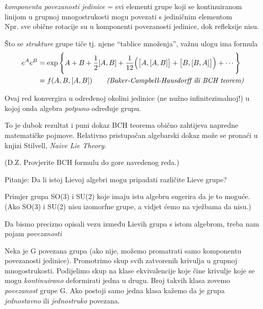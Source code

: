 \emph{komponenta povezanosti jedinice} = svi elementi grupe koji se
kontinuiranom linijom u grupnoj mnogostrukosti mogu povezati s
jediničnim elementom\\
 Npr. sve obične rotacije su u komponenti povezanosti
jedinice, dok refleksije nisu.


Što se \emph{strukture} grupe tiče tj. njene ``tablice množenja'', važnu
ulogu ima formula
\begin{equation}
\begin{split}
  e^A e^B &= \exp\Bigg\{A+B+\frac{1}{2}[A,B]+\frac{1}{12}\Big(\big[A,[A,B]\big]+
 \big[B,[B,A]\big]\Big)+\cdots \Bigg\} \\
          &= f(A,B,[A,B]) \qquad \text{\emph{(Baker-Campbell-Hausdorff ili BCH teorem)}}
\end{split}
\end{equation}

Ovaj red konvergira u određenoj okolini jedinice (ne nužno infinitezimalnoj!)
u kojoj onda algebra \emph{potpuno} određuje grupu.

To je dubok rezultat i puni dokaz BCH teorema obično zahtijeva napredne matematičke
pojmove. Relativno pristupačan algebarski dokaz može se pronaći u knjizi
Stilvell, \emph{Naive Lie Theory}.

(D.Z. Provjerite BCH formulu do gore navedenog reda.)

Pitanje: Da li istoj Lievoj algebri mogu pripadati različite Lieve grupe?

Primjer grupa SO(3) i SU(2) koje imaju istu algebru sugerira da je to moguće. 
(Ako SO(3) i SU(2) nisu izomorfne grupe, a vidjet ćemo na vježbama da nisu.)

Da bismo precizno opisali vezu između Lievih grupa s istom algebrom, treba
nam pojam \emph{povezanosti}

\begin{definicija}[Povezanost]
  Neka je G povezana grupa (ako nije, možemo promatrati samo komponentu
povezanosti jedinice). Promotrimo skup svih zatvorenih krivulja u grupnoj 
mnogostrukosti. Podijelimo skup  na klase ekvivalencije koje čine 
krivulje koje se mogu \emph{kontinuirano} deformirati jedna u drugu.
Broj takvih klasa zovemo \emph{povezanost} grupe G. Ako postoji samo
jedna klasa kažemo da je grupa \emph{jednostavno} ili \emph{jednostruko}
povezana.
\end{definicija}

